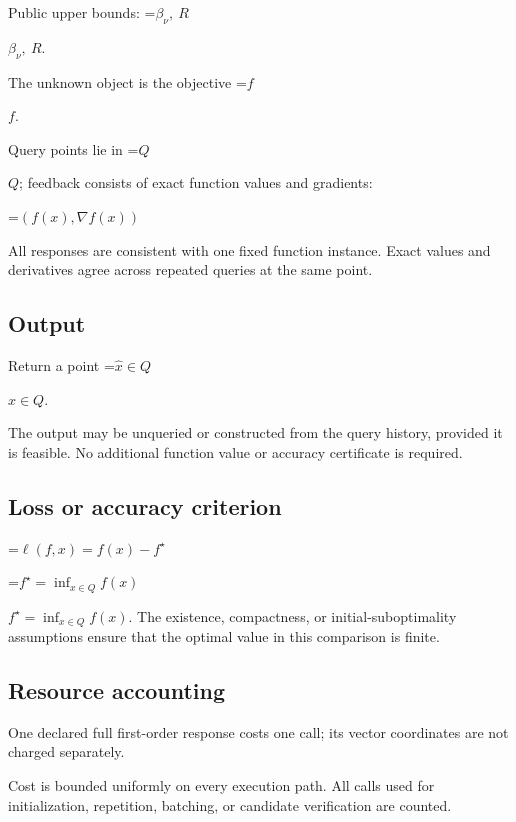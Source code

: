 \documentclass[10pt,a4paper]{article}
\newcommand{\AtlasMath}[1]{\par\begingroup\centering\setbox0=\hbox{$\displaystyle #1$}\ifdim\wd0>1.4\linewidth\typeout{ATLAS WIDE FORMULA: \the\wd0}\fi\ifdim\wd0>\linewidth\resizebox{\linewidth}{!}{\box0}\else\box0\fi\par\endgroup}
\newcommand{\AtlasInlineMath}[1]{\begingroup\setbox0=\hbox{$#1$}\ifdim\wd0>.4\linewidth\endgroup\AtlasMath{#1}\else\endgroup$#1$\fi}
\begin{document}
Public upper bounds: \AtlasInlineMath{\beta_\nu,\ R}.



The unknown object is the objective \AtlasInlineMath{f}.



Query points lie in \AtlasInlineMath{Q}; feedback consists of exact function values and gradients:




\AtlasMath{(f(x),\nabla f(x))}




All responses are consistent with one fixed function instance. Exact values and derivatives agree across repeated queries at the same point.



\subsection{Output}


Return a point \AtlasInlineMath{\widehat x\in Q}.



The output may be unqueried or constructed from the query history, provided it is feasible. No additional function value or accuracy certificate is required.



\subsection{Loss or accuracy criterion}



\AtlasMath{\ell(f,x)=f(x)-f^\star}




\AtlasInlineMath{f^\star=\inf_{x\in Q}f(x)}. The existence, compactness, or initial-suboptimality assumptions ensure that the optimal value in this comparison is finite.



\subsection{Resource accounting}


One declared full first-order response costs one call; its vector coordinates are not charged separately.



Cost is bounded uniformly on every execution path. All calls used for initialization, repetition, batching, or candidate verification are counted.
\end{document}
